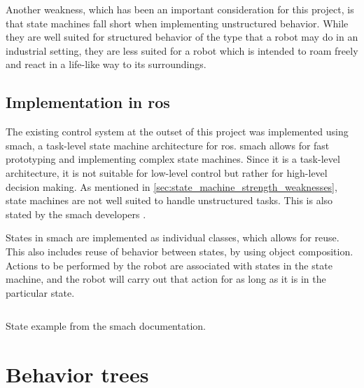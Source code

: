 \documentclass[\rootfolder/main.tex]{subfiles}
\begin{document}
Another weakness, which has been an important consideration for this project, is that state machines fall short when implementing unstructured behavior.
While they are well suited for structured behavior of the type that a robot may do in an industrial setting, they are less suited for a robot which is intended to roam freely and react in a life-like way to its surroundings.


\subsection{Implementation in \acrshort{ros}}

The existing control system at the outset of this project was implemented using \acrshort{smach}, a task-level state machine architecture for \acrshort{ros}.
\acrshort{smach} allows for fast prototyping and implementing complex state machines.
Since it is a task-level architecture, it is not suitable for low-level control but rather for high-level decision making.
As mentioned in \cref{sec:state_machine_strength_weaknesses}, state machines are not well suited to handle unstructured tasks.
This is also stated by the \acrshort{smach} developers \cite{Bohren}.

States in \acrshort{smach} are implemented as individual classes, which allows for reuse.
This also includes reuse of behavior between states, by using object composition.
Actions to be performed by the robot are associated with states in the state machine, and the robot will carry out that action for as long as it is in the particular state.

\begin{listing}
\inputminted{python}{\rootfolder/Chapters/Chapter2/Listings/smachstate.py}
\caption{State example from the \acrshort{smach} documentation.}
\end{listing}


\section{Behavior trees}
\end{document}
